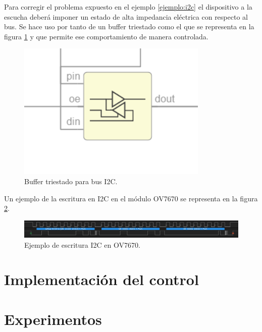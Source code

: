 Para corregir el problema expuesto en el ejemplo \ref{ejemplo:i2c} el dispositivo a la escucha deberá imponer un estado de alta impedancia eléctrica con respecto al bus. Se hace uso por tanto de un buffer triestado como el que se representa en la figura \ref{fig:buffer_triestado} y que permite ese comportamiento de manera controlada.
\begin{figure}[H]
	\center
	\includegraphics[scale=0.6, angle=0]{imagenes/Cuadricoptero_vision/triestado}
	\caption{Buffer triestado para bus I2C.}
	\label{fig:buffer_triestado}
\end{figure}

Un ejemplo de la escritura en I2C en el módulo OV7670 se representa en la figura \ref{fig:i2c_example}.

\begin{figure}[H]
	\center
	\includegraphics[scale=0.4, angle=0]{imagenes/Cuadricoptero_vision/i2c_example}
	\caption{Ejemplo de escritura I2C en OV7670.}
	\label{fig:i2c_example}
\end{figure}

\section{Implementación del control}
\section{Experimentos}









